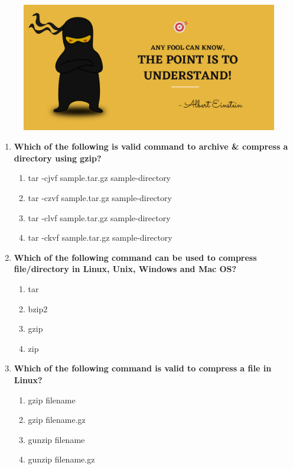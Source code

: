 \setlength{\columnsep}{3pt}
\begin{flushleft}
	
	\paragraph{}
	\bigskip
	
	\begin{figure}[h!]
		\centering
		\includegraphics[scale=.2]{content/practise.jpg}
	\end{figure}	
	\begin{enumerate}
			
		\item \textbf{Which of the following is valid command to archive \& compress a directory using gzip?}
		\begin{enumerate}[label=(\alph*)]
			\item tar -cjvf sample.tar.gz  sample-directory
			\item tar -czvf sample.tar.gz  sample-directory   %
			\item tar -clvf sample.tar.gz  sample-directory
			\item tar -ckvf sample.tar.gz  sample-directory
		\end{enumerate}
		\bigskip
		\bigskip
		
		\item \textbf{Which of the following command can be used to compress file/directory in Linux, Unix, Windows and Mac OS?}
		\begin{enumerate}[label=(\alph*)]
			\item tar
			\item bzip2
			\item gzip
			\item zip     %
		\end{enumerate}
		\bigskip
		\bigskip	
		
		\item \textbf{Which of the following command is valid to compress a file in Linux?}
		\begin{enumerate}[label=(\alph*)]
			\item gzip filename         %
			\item gzip filename.gz
			\item gunzip filename
			\item gunzip filename.gz
		\end{enumerate}
		\bigskip
		\bigskip
		

\end{enumerate}
\end{flushleft}
